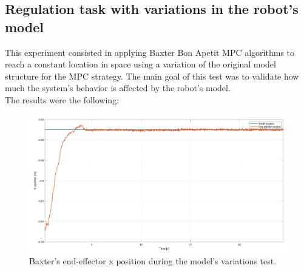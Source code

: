 \documentclass[11pt]{report} %
\begin{document}
\begin{table}[H]
\begin{center}
\caption{\label{tab:performance_metrics_tracking} Performance metrics for mouth tracking experiment.}
\end{center}
\end{table}

\subsection{Regulation task with variations in the robot's model}

This experiment consisted in applying Baxter Bon Apetit MPC algorithms to reach a constant location in space using a variation of the original model structure for the MPC strategy. The main goal of this test was to validate how much the system's behavior is affected by the robot's model. \\

The results were the following: 

\begin{figure}[H]
    \centering
    \includegraphics[width=1.0\linewidth]{assets/imgs/control_theory/mpc_regulation_model_changed/x_pose.png}
    \caption{Baxter's end-effector x position during the model's variations test.} 
    \label{fig_baxter_x_pose_mpc_model_perturbations_experiments}
\end{figure}
\end{document}
